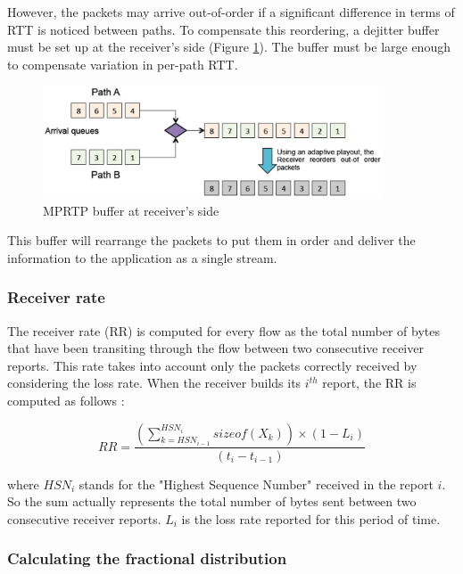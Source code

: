 However, the packets may arrive out-of-order if a significant difference in terms of RTT is noticed between paths. To compensate this reordering, a dejitter buffer must be set up at the receiver's side (Figure \ref{fig:mprtp-dejitter}). The buffer must be large enough to compensate variation in per-path RTT.

\begin{figure}[!h]
\centering
\includegraphics[width=0.9\textwidth]{images/mprtp-dejitter}
\caption{MPRTP buffer at receiver's side}
\label{fig:mprtp-dejitter}
\end{figure}

This buffer will rearrange the packets to put them in order and deliver the information to the application as a single stream.

\subsubsection{Receiver rate}

The receiver rate (RR) is computed for every flow as the total number of bytes that have been transiting through the flow between two consecutive receiver reports. This rate takes into account only the packets correctly received by considering the loss rate. When the receiver builds its $i^{th}$ report, the RR is computed as follows :

\begin{equation*}
RR = \frac{(\sum_{k = HSN_{i-1}}^{HSN_i} sizeof(X_k)) \times (1 - L_i)}{(t_i - t_{i-1})}
\end{equation*}

where $HSN_i$ stands for the "Highest Sequence Number" received in the report $i$. So the sum actually represents the total number of bytes sent between two consecutive receiver reports. $L_i$ is the loss rate reported for this period of time.

\subsubsection{Calculating the fractional distribution}

